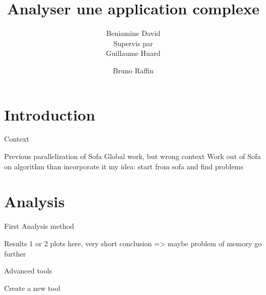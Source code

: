 \documentclass[xcolor={usenames,dvipsnames}]{beamer}
\title[]{Analyser une application complexe}
\subtitle{}
\author[Beniamine David]{Beniamine David\\ Supervis par \\
    Guillaume Huard \and Bruno Raffin}
\institute[MOAIS]{Univ. Grenoble alpes, Lig - Inria team MOAIS}
\newcommand{\sectiontitle}{}
\newcommand{\newsection}[1]{\renewcommand{\sectiontitle}{#1}\section{#1}}
\begin{document}

\begin{frame}{ }
    \titlepage
\end{frame}





\newsection{Introduction}
\begin{frame}{Context}
    \cite{Allard07SOFA,Faure11Sparse,Nesme09Preserving}
\end{frame}

\begin{frame}{Previous parallelization of Sofa}
    Global work, but wrong context
    \cite{Hermann10Simulations}
    Work out of Sofa on algorithm than incorporate it
    \cite{Toss12New}
    my idea: start from sofa and find problems
\end{frame}

\newsection{Analysis}

\begin{frame}{First Analysis}
    method
\end{frame}

\begin{frame}{Results}
    1 or 2 plots here, very short
    conclusion => maybe problem of memory go further
\end{frame}

\begin{frame}{Advanced tools}
\end{frame}

\begin{frame}{Create a new tool}
\end{frame}
\end{document}
